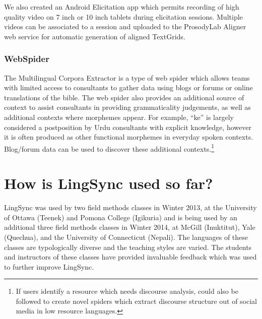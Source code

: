 \documentclass[letterpaper, 12pt, dvips]{mitwpl}
\begin{document}
We also created an Android Elicitation app which permits recording of high quality video on 7 inch or 10 inch tablets during elicitation sessions.
Multiple videos can be associated to a session and uploaded to the ProsodyLab Aligner web service for automatic generation of aligned TextGrids. 




\subsubsection{WebSpider}

The Multilingual Corpora Extractor is a type of web spider which allows teams with limited access to consultants to gather data using blogs or forums or online translations of the bible.
The web spider also provides an additional source of context to assist consultants in providing grammaticality judgements,
as well as additional contexts where morphemes appear.
For example,
``ke'' is largely considered a postposition by Urdu consultants with explicit knowledge,
however it is often produced as other functional morphemes in everyday spoken contexts.
Blog/forum data can be used to discover these additional contexts.\footnote{
If users identify a resource which needs discourse analysis, \cite{Dubuc:2010} could also be followed to create novel spiders which extract discourse structure out of social media in low resource languages.}

\section{How is LingSync used so far?} 
\label{sec:use}



LingSync was used by two field methods classes in Winter 2013,
at the University of Ottawa (Teenek) and Pomona College  (Igikuria) and is being used by an additional three field methods classes in Winter 2014,
at McGill (Inuktitut),
Yale (Quechua),
and the University of Connecticut (Nepali).
The languages of these classes are typologically diverse and the teaching styles are varied.
The students and instructors of these classes have provided invaluable feedback which was used to further improve LingSync.
\end{document}
